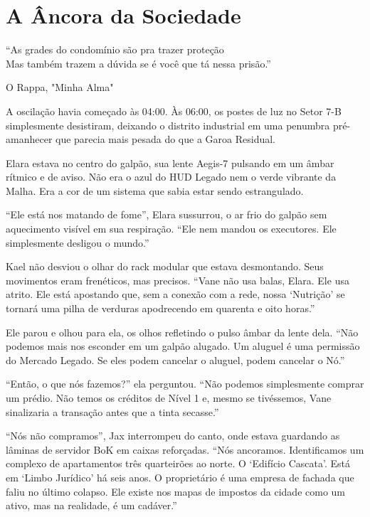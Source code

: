 
\chapter{A Âncora da Sociedade}
\epigraph{``As grades do condomínio são pra trazer proteção \\ Mas também trazem a dúvida se é você que tá nessa prisão.''}{O Rappa, "Minha Alma"}

A oscilação havia começado às 04:00. Às 06:00, os postes de luz no Setor 7-B simplesmente desistiram, deixando o distrito industrial em uma penumbra pré-amanhecer que parecia mais pesada do que a Garoa Residual.

Elara estava no centro do galpão, sua lente Aegis-7 pulsando em um âmbar rítmico e de aviso. Não era o azul do HUD Legado nem o verde vibrante da Malha. Era a cor de um sistema que sabia estar sendo estrangulado.


``Ele está nos matando de fome'', Elara sussurrou, o ar frio do galpão sem aquecimento visível em sua respiração. ``Ele nem mandou os executores. Ele simplesmente desligou o mundo.''

Kael não desviou o olhar do rack modular que estava desmontando. Seus movimentos eram frenéticos, mas precisos. ``Vane não usa balas, Elara. Ele usa atrito. Ele está apostando que, sem a conexão com a rede, nossa `Nutrição' se tornará uma pilha de verduras apodrecendo em quarenta e oito horas.''

Ele parou e olhou para ela, os olhos refletindo o pulso âmbar da lente dela. ``Não podemos mais nos esconder em um galpão alugado. Um aluguel é uma permissão do Mercado Legado. Se eles podem cancelar o aluguel, podem cancelar o Nó.''

``Então, o que nós fazemos?'' ela perguntou. ``Não podemos simplesmente comprar um prédio. Não temos os créditos de Nível 1 e, mesmo se tivéssemos, Vane sinalizaria a transação antes que a tinta secasse.''

``Nós não compramos'', Jax interrompeu do canto, onde estava guardando as lâminas de servidor BoK em caixas reforçadas. ``Nós ancoramos. Identificamos um complexo de apartamentos três quarteirões ao norte. O `Edifício Cascata'. Está em `Limbo Jurídico' há seis anos. O proprietário é uma empresa de fachada que faliu no último colapso. Ele existe nos mapas de impostos da cidade como um ativo, mas na realidade, é um cadáver.''


